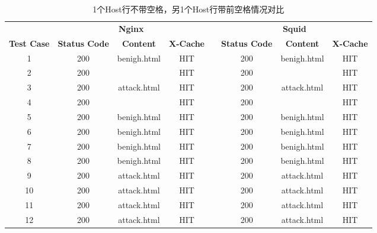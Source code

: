 \begin{table}
	\renewcommand\arraystretch{1.1}      %
	\caption{1个Host行不带空格，另1个Host行带前空格情况对比}
	\vspace{1.2mm}                  %
	\centering                            %
	{\tabcolsep  0.05in                    %
		\begin{tabular}{cccccccc}
			\hline
			& \multicolumn{3}{c}{\textbf{Nginx}} & & \multicolumn{3}{c}{\textbf{Squid}}\\
			\cline{2-4}\cline{6-8}
			\textbf{Test Case}& \textbf{Status Code} & \textbf{Content}  & \textbf{X-Cache}  & &  \textbf{Status Code}  & \textbf{Content} & \textbf{X-Cache}\\
			\hline
			1 &   200  &  benigh.html  &  HIT  & &  200  &  benigh.html  &  HIT \\
			2 &  200 &   {\color{red}{attack.html}} &  HIT  & &  200  &  {\color{red}{benigh.html}}  &  HIT \\
			3 &  200  &  attack.html &  HIT  & &  200  &  attack.html  &  HIT \\
			4 &  200 &  {\color{red}{benigh.html}} &  HIT      & &  200 & {\color{red}{attack.html}}   &  HIT \\
			5 &  200 &  benigh.html  &  HIT  & &  200 &  benigh.html  &  HIT \\
			6 &  200 &  benigh.html  &  HIT     & &  200 & benigh.html     &  HIT \\
			7 &   200  &  benigh.html  &  HIT  & &  200  &  benigh.html  &  HIT \\
			8 &  200 &  benigh.html  &  HIT  & &  200  &  benigh.html  &  HIT \\
			9 &  200  &  attack.html &  HIT  & &  200  &  attack.html  &  HIT \\
			10 &  200 &  attack.html&  HIT      & &  200 & attack.html   &  HIT \\
			11 &  200 &  attack.html  &  HIT  & &  200 &  attack.html  &  HIT \\
			12 &  200 &  attack.html  &  HIT     & &  200 & attack.html     &  HIT \\
			\hline
		\end{tabular}
	}
\end{table}

